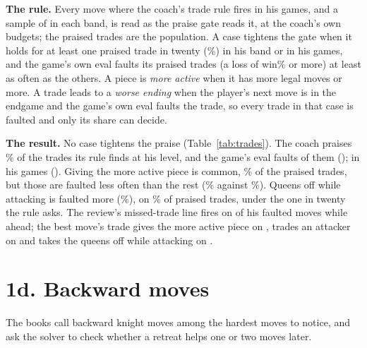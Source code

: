 \documentclass[11pt]{article}
\begin{document}
\textbf{The rule.} Every move where the coach's trade rule fires in his games, and a sample of
\TradeHisTrades{} in each band, is read as the praise gate reads it, at the coach's own budgets; the
praised trades are the population. A case tightens the gate when it holds for at least one praised
trade in twenty (\TradeShareBar\%) in his band or in his games, and the game's own eval faults its
praised trades (a loss of \TradeFaultBar{} win\% or more) at least as often as the others. A piece is
\emph{more active} when it has \TradeMobilityGap{} more legal moves or more. A trade leads to a \emph{worse
ending} when the player's next move is in the endgame and the game's own eval faults the trade, so
every trade in that case is faulted and only its share can decide.

\textbf{The result.} No case tightens the praise (Table~\ref{tab:trades}). The coach praises
\TradeHisPraised\% of the trades its rule finds at his level, and the game's eval faults
\TradeHisFaulted{} of them (\TradeHisFaultedCount); in his games \TradeArchiveFaulted{}
(\TradeArchiveFaultedCount). Giving the more active piece is common, \TradeActiveShare\% of the
praised trades, but those are faulted less often than the rest (\TradeActiveFaulted\% against
\TradeActiveOthers\%). Queens off while attacking is faulted more (\TradeQueensFaulted\%), on
\TradeQueensShare\% of praised trades, under the one in twenty the rule asks. The review's
missed-trade line fires on \TradeLineFires{} of his \TradeLineFaultedAhead{} faulted moves while
ahead; the best move's trade gives the more active piece on \TradeLineActive, trades an attacker on
\TradeLineAttacker{} and takes the queens off while attacking on \TradeLineQueens.

\begin{table}[h]
\centering
\scriptsize\TradeTable
\caption{The books' cases among the coach's praised trades: each case's share, how often the game's
own eval faults the praised trades in it, and the other praised trades.}
\label{tab:trades}
\end{table}

\section{1d. Backward moves}

The books call backward knight moves among the hardest moves to notice, and ask the solver to check
whether a retreat helps one or two moves later.
\end{document}
